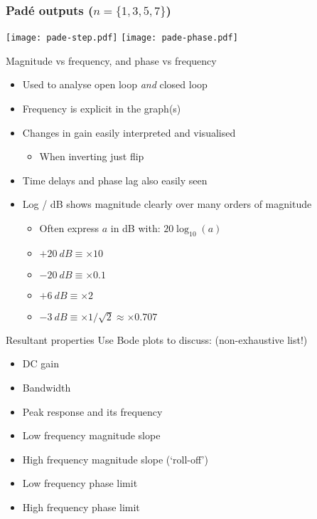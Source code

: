\documentclass{beamer-control}
\begin{document}
\begin{frame}
\frametitle{Padé outputs ($n=\{1,3,5,7\}$)}

\centerline{\texttt{[image: pade-step.pdf]}
\texttt{[image: pade-phase.pdf]}}


\end{frame}


\begin{frame}{Magnitude vs frequency, and phase vs frequency}
  \begin{itemize}
    \item  Used to analyse open loop \emph{and} closed loop
    \item  Frequency is explicit in the graph(s)
    \item  Changes in gain easily interpreted and visualised
    \begin{itemize}
      \item  When inverting just flip
    \end{itemize}
    \item  Time delays and phase lag also easily seen
    \item  Log / dB shows magnitude clearly over many orders of magnitude
\begin{itemize}
  \item Often express $a$ in dB with: $20\log_{10}(a)$
  \item $+\SI{20}{dB} \equiv \times 10$
  \item $-\SI{20}{dB} \equiv \times 0.1$
  \item $+\SI{6}{dB}  \equiv \times 2$
  \item $-\SI{3}{dB}  \equiv \times 1/\sqrt{2} \approx \times 0.707$
\end{itemize}
  \end{itemize}
\end{frame}

\begin{frame}{Resultant properties}
  Use Bode plots to discuss: (non-exhaustive list!)
  \begin{itemize}
    \item  DC gain
    \item  Bandwidth
    \item  Peak response and its frequency
    \item  Low frequency magnitude slope
    \item  High frequency magnitude slope (`roll-off')
    \item  Low frequency phase limit
    \item  High frequency phase limit
  \end{itemize}
\end{frame}
\end{document}
